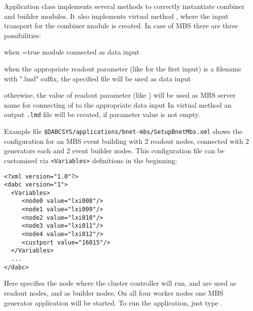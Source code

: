 Application class  implements several methods to
correctly instantiate combiner and builder modules.
It also implements virtual method , where the input transport 
for the combiner module is created. In case of MBS there are three possibilities:
\bnum
\item when =true module  connected as data input 
\item when the appropriate readout parameter (like  for the first input) 
is a filename with ".lmd" suffix, the specified file will be used as data input
\item otherwise, the value of readout parameter (like ) will be used as MBS server name for connecting of  to the appropriate data input         
\enum
In virtual method  an output {\tt\*.lmd} file will be created, if 
parameter  value is not empty.

Example file {\tt \$DABCSYS/applications/bnet-mbs/SetupBnetMbs.xml}
shows the configuration for an MBS event building with 2 readout nodes, connected with 2 generators each and 2 event builder nodes. 
This configuration file can be customised via {\tt <Variables>} definitions 
in the beginning:
\begin{small}
\begin{verbatim}
<?xml version="1.0"?>
<dabc version="1">
  <Variables>
     <node0 value="lxi008"/>
     <node1 value="lxi009"/>
     <node2 value="lxi010"/>
     <node3 value="lxi011"/>
     <node4 value="lxi012"/>
     <custport value="16015"/>
  </Variables>
  ...
</dabc>
\end{verbatim}
\end{small}

Here  specifies the node where the cluster controller will run,  and  are used as readout nodes,
 and  as builder nodes. On all four worker nodes one MBS generator
application will be started. To run the application, just type .  

